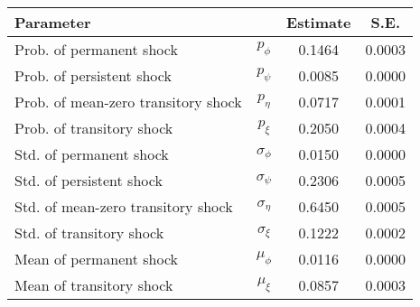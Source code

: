 \begin{tabular}{lccc} 
\toprule 
Parameter & & Estimate & S.E. \\ 
\midrule 
Prob. of permanent shock & $p_{\phi}$ &  0.1464 &  0.0003 \\ 
Prob. of persistent shock & $p_{\psi}$ &  0.0085 &  0.0000 \\ 
Prob. of mean-zero transitory shock & $p_{\eta}$ &  0.0717 &  0.0001 \\ 
Prob. of transitory shock & $p_{\xi}$ &  0.2050 &  0.0004 \\ 
Std. of permanent shock & $\sigma_{\phi}$ &  0.0150 &  0.0000 \\ 
Std. of persistent shock & $\sigma_{\psi}$ &  0.2306 &  0.0005 \\ 
Std. of mean-zero transitory shock & $\sigma_{\eta}$ &  0.6450 &  0.0005 \\ 
Std. of transitory shock & $\sigma_{\xi}$ &  0.1222 &  0.0002 \\ 
Mean of permanent shock & $\mu_{\phi}$ &  0.0116 &  0.0000 \\ 
Mean of transitory shock & $\mu_{\xi}$ &  0.0857 &  0.0003 \\ 
\bottomrule
\end{tabular}
